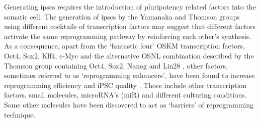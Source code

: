 Generating \glspl{ipsc} requires the introduction of pluripotency related factors into the somatic cell. 
The generation of \glspl{ipsc} by the Yamanaka and Thomson groups using different cocktails of transcription factors may suggest that different factors activate the same reprogramming pathway by reinforcing each other’s synthesis.
As a consequence, apart from the `fantastic four' OSKM transcription factors, Oct4, Sox2, Klf4, c-Myc and the alternative OSNL combination described by the Thomson group containing Oct4, Sox2, Nanog and Lin28 \cite{yu2007induced}, other factors, sometimes referred to as `reprogramming enhancers', have been found to increase reprogramming efficiency and iPSC quality \cite{takahashi2016decade}.
Those include other transcription factors, small molecules, microRNA’s (miR) and different culturing conditions. 
Some other molecules have been discovered to act as `barriers' of reprogramming technique. 



